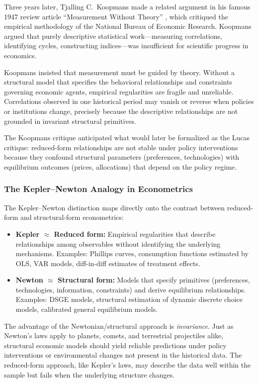 \documentclass[12pt]{article}
\begin{document}
Three years later, Tjalling C.\ Koopmans made a related argument in his famous 1947 review article ``Measurement Without Theory'' \cite{Koopmans1947}, which critiqued the empirical methodology of the National Bureau of Economic Research. Koopmans argued that purely descriptive statistical work---measuring correlations, identifying cycles, constructing indices---was insufficient for scientific progress in economics.

Koopmans insisted that measurement must be guided by theory. Without a structural model that specifies the behavioral relationships and constraints governing economic agents, empirical regularities are fragile and unreliable. Correlations observed in one historical period may vanish or reverse when policies or institutions change, precisely because the descriptive relationships are not grounded in invariant structural primitives.

The Koopmans critique anticipated what would later be formalized as the Lucas critique: reduced-form relationships are not stable under policy interventions because they confound structural parameters (preferences, technologies) with equilibrium outcomes (prices, allocations) that depend on the policy regime.

\subsubsection{The Kepler--Newton Analogy in Econometrics}

The Kepler--Newton distinction maps directly onto the contrast between reduced-form and structural-form econometrics:
\begin{itemize}
\item \textbf{Kepler $\approx$ Reduced form:} Empirical regularities that describe relationships among observables without identifying the underlying mechanisms. Examples: Phillips curves, consumption functions estimated by OLS, VAR models, diff-in-diff estimates of treatment effects.

\item \textbf{Newton $\approx$ Structural form:} Models that specify primitives (preferences, technologies, information, constraints) and derive equilibrium relationships. Examples: DSGE models, structural estimation of dynamic discrete choice models, calibrated general equilibrium models.
\end{itemize}

The advantage of the Newtonian/structural approach is \emph{invariance}. Just as Newton's laws apply to planets, comets, and terrestrial projectiles alike, structural economic models should yield reliable predictions under policy interventions or environmental changes not present in the historical data. The reduced-form approach, like Kepler's laws, may describe the data well within the sample but fails when the underlying structure changes.
\end{document}
